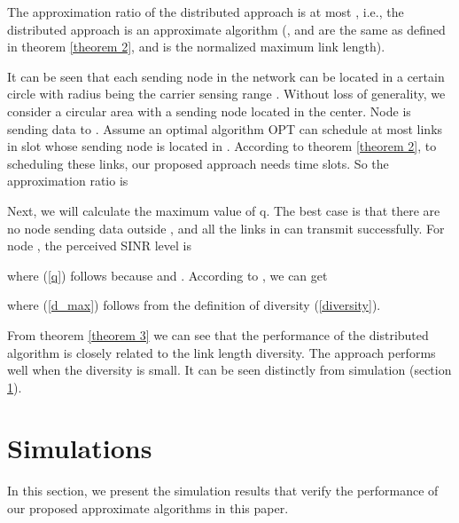 \documentclass[conference]{IEEEtran}
\begin{document}
\begin{theorm}\label{theorem 3}
The approximation ratio of the distributed approach is at most
, i.e., the distributed
approach is an  approximate algorithm (,
 and  are the same as defined in theorem \ref{theorem
2}, and  is the normalized maximum link length).
\end{theorm}
\begin{IEEEproof}
It can be seen that each sending node in the network can be located
in a certain circle with radius being the carrier sensing range
. Without loss of generality, we consider a circular area
 with a sending node  located in the center. Node
 is sending data to . Assume an optimal algorithm OPT can
schedule at most  links in  slot whose sending node is
located in . According to theorem \ref{theorem 2}, to
scheduling these  links, our proposed approach needs 
time slots. So the approximation ratio is


Next, we will calculate the maximum value of q. The best case is
that there are no node sending data outside , and all
the links in  can transmit successfully. For node ,
the perceived  SINR level is

where (\ref{q}) follows because  and . According to , we can get

where (\ref{d_max}) follows from the definition of diversity
(\ref{diversity}).
\end{IEEEproof}

From theorem \ref{theorem 3} we can see that the performance of the
distributed algorithm is closely related to the link length
diversity. The approach performs well when the diversity is small.
It can be seen distinctly from simulation (section \ref{section6}).
\section{Simulations}\label{section6}
In this section, we present the simulation results that verify the
performance of our proposed approximate algorithms in this paper.
\end{document}

